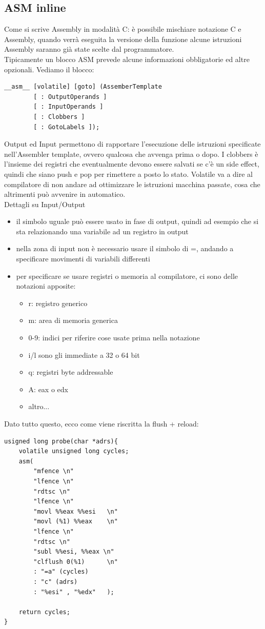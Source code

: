 \documentclass[12pt, oneside]{extbook}
\begin{document}
\subsection{ASM inline}
Come si scrive Assembly in modalità C: è possibile mischiare notazione C e Assembly, quando verrà eseguita la versione della funzione alcune istruzioni Assembly saranno già state scelte dal programmatore.\\ Tipicamente un blocco ASM prevede alcune informazioni obbligatorie ed altre opzionali. Vediamo il blocco:
\begin{lstlisting}
__asm__ [volatile] [goto] (AssemberTemplate
		[ : OutputOperands ]
		[ : InputOperands ]
		[ : Clobbers ]
		[ : GotoLabels ]);
\end{lstlisting}
Output ed Input permettono di rapportare l'esecuzione delle istruzioni specificate nell'Assembler template, ovvero qualcosa che avvenga prima o dopo. I clobbers è l'insieme dei registri che eventualmente devono essere salvati se c'è un side effect, quindi che siano push e pop per rimettere a posto lo stato. Volatile va a dire al compilatore di non andare ad ottimizzare le istruzioni macchina passate, cosa che altrimenti può avvenire in automatico.\\ Dettagli su Input/Output
\begin{itemize}
\item il simbolo uguale può essere usato in fase di output, quindi ad esempio che si sta relazionando una variabile ad un registro in output
\item nella zona di input non è necessario usare il simbolo di =, andando a specificare movimenti di variabili differenti
\item per specificare se usare registri o memoria al compilatore, ci sono delle notazioni apposite:
\begin{itemize}
\item r: registro generico
\item m: area di memoria generica
\item 0-9: indici per riferire cose usate prima nella notazione
\item i/l sono gli immediate a 32 o 64 bit
\item q: registri byte addressable
\item A: eax o edx
\item altro...
\end{itemize}
\end{itemize}
Dato tutto questo, ecco come viene riscritta la flush + reload:
\begin{lstlisting}
usigned long probe(char *adrs){
	volatile unsigned long cycles;
	asm(
		"mfence \n"
		"lfence \n"
		"rdtsc \n"
		"lfence \n"
		"movl %%eax %%esi	\n"
		"movl (%1) %%eax	\n"
		"lfence \n"
		"rdtsc \n"
		"subl %%esi, %%eax \n"
		"clflush 0(%1)		\n"
		: "=a" (cycles)
		: "c" (adrs)
		: "%esi" , "%edx"   );
	
	return cycles;
}
\end{lstlisting}
\end{document}

